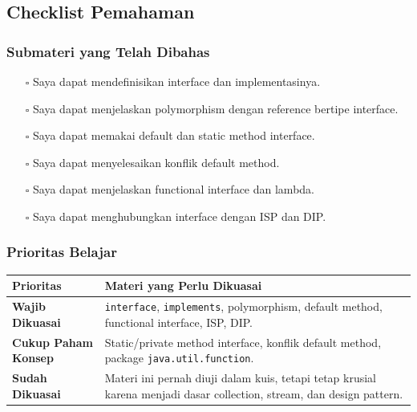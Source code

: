 \subsection{Checklist Pemahaman}

\subsubsection{Submateri yang Telah Dibahas}

\begin{itemize}
    \item[$\square$] Saya dapat mendefinisikan interface dan implementasinya.
    \item[$\square$] Saya dapat menjelaskan polymorphism dengan reference bertipe interface.
    \item[$\square$] Saya dapat memakai default dan static method interface.
    \item[$\square$] Saya dapat menyelesaikan konflik default method.
    \item[$\square$] Saya dapat menjelaskan functional interface dan lambda.
    \item[$\square$] Saya dapat menghubungkan interface dengan ISP dan DIP.
\end{itemize}

\subsubsection{Prioritas Belajar}

\begin{tabularx}{\textwidth}{|L{0.22\textwidth}|X|}
\hline
\textbf{Prioritas} & \textbf{Materi yang Perlu Dikuasai} \\
\hline
\textbf{Wajib Dikuasai} & \texttt{interface}, \texttt{implements}, polymorphism, default method, functional interface, ISP, DIP. \\
\hline
\textbf{Cukup Paham Konsep} & Static/private method interface, konflik default method, package \texttt{java.util.function}. \\
\hline
\textbf{Sudah Dikuasai} & Materi ini pernah diuji dalam kuis, tetapi tetap krusial karena menjadi dasar collection, stream, dan design pattern. \\
\hline
\end{tabularx}
